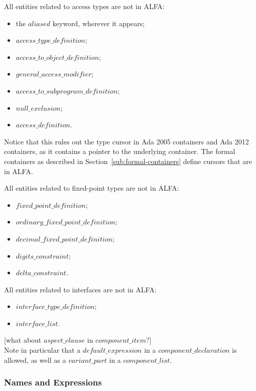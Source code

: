 \documentclass{article}
\newcommand{\bnf}[1]{$\mathit{#1}$}
\begin{document}
All entities related to access types are not in ALFA:
\begin{itemize}
\item the \bnf{aliased} keyword, wherever it appears;
\item \bnf{access\_type\_definition};
\item \bnf{access\_to\_object\_definition};
\item \bnf{general\_access\_modifier};
\item \bnf{access\_to\_subprogram\_definition};
\item \bnf{null\_exclusion};
\item \bnf{access\_definition}.
\end{itemize}

Notice that this rules out the type cursor in Ada 2005 containers and Ada 2012
containers, as it contains a pointer to the underlying container. The formal
containers as described in Section~\ref{sub:formal-containers} define cursors
that are in ALFA.

All entities related to fixed-point types are not in ALFA:
\begin{itemize}
\item \bnf{fixed\_point\_definition};
\item \bnf{ordinary\_fixed\_point\_definition};
\item \bnf{decimal\_fixed\_point\_definition};
\item \bnf{digits\_constraint};
\item \bnf{delta\_constraint}.
\end{itemize}

All entities related to interfaces are not in ALFA:
\begin{itemize}
\item \bnf{interface\_type\_definition};
\item \bnf{interface\_list}.
\end{itemize}

[what about \bnf{aspect\_clause} in \bnf{component\_item}?]\\

Note in particular that a \bnf{default\_expression} in a
\bnf{component\_declaration} is allowed, as well as a \bnf{variant\_part} in
a \bnf{component\_list}.

\subsubsection{Names and Expressions}
\end{document}
